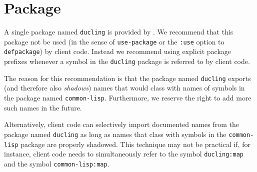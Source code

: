 \chapter{Package}

A single package named \texttt{ducling} is provided by \sysname{}.  We
recommend that this package not be used (in the sense of
\texttt{use-package} or the \texttt{:use} option to
\texttt{defpackage}) by client code.  Instead we recommend using
explicit package prefixes whenever a symbol in the \texttt{ducling}
package is referred to by client code.

The reason for this recommendation is that the package named
\texttt{ducling} exports (and therefore also \emph{shadows}) names
that would class with names of symbols in the package named
\texttt{common-lisp}.  Furthermore, we reserve the right to add more
such names in the future.

Alternatively, client code can selectively import documented names
from the package named \texttt{ducling} as long as names that class
with symbols in the \texttt{common-lisp} package are properly
shadowed.  This technique may not be practical if, for instance,
client code needs to simultaneously refer to the symbol
\texttt{ducling:map} and the symbol \texttt{common-lisp:map}.
